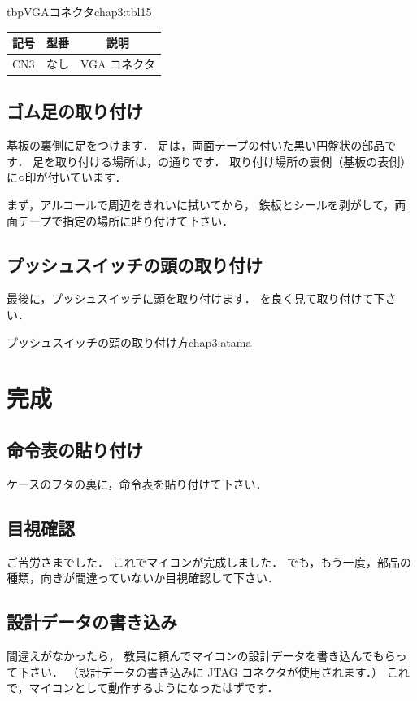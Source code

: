 \begin{mytable}{tbp}{VGAコネクタ}{chap3:tbl15}
{\small\begin{tabular}{l|l|l}
\hline
\hline
\multicolumn{1}{c|}{記号} &
\multicolumn{1}{c|}{型番} &
\multicolumn{1}{c}{説明} \\
\hline
CN3 & なし & VGA コネクタ \\
\end{tabular}}
\end{mytable}


\subsection{ゴム足の取り付け}
基板の裏側に足をつけます．
足は，両面テープの付いた黒い円盤状の部品です．
足を取り付ける場所は，の通りです．
取り付け場所の裏側（基板の表側）に○印が付いています．

まず，アルコールで周辺をきれいに拭いてから，
鉄板とシールを剥がして，両面テープで指定の場所に貼り付けて下さい．


\subsection{プッシュスイッチの頭の取り付け}
最後に，プッシュスイッチに頭を取り付けます．
を良く見て取り付けて下さい．

{プッシュスイッチの頭の取り付け方}{chap3:atama}

\section{完成}

\subsection{命令表の貼り付け}
ケースのフタの裏に，命令表を貼り付けて下さい．

\subsection{目視確認}
ご苦労さまでした．
これでマイコンが完成しました．
でも，もう一度，部品の種類，向きが間違っていないか目視確認して下さい．


\subsection{設計データの書き込み}
間違えがなかったら，
教員に頼んでマイコンの設計データを書き込んでもらって下さい．
（設計データの書き込みに JTAG コネクタが使用されます．）
これで，マイコンとして動作するようになったはずです．

